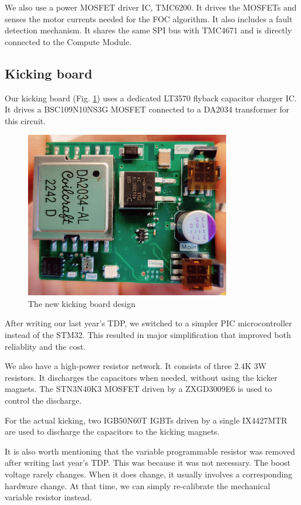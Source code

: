 \documentclass[runningheads]{llncs}
\begin{document}
We also use a power MOSFET driver IC, TMC6200. It drives the MOSFETs and senses the motor currents needed for the FOC algorithm. It also includes a fault detection mechanism. It shares the same SPI bus with TMC4671 and is directly connected to the Compute Module.

\subsection{Kicking board}
Our kicking board (Fig. \ref{fig:mikona}) uses a dedicated LT3570 flyback capacitor charger IC. It drives a BSC109N10NS3G MOSFET connected to a DA2034 transformer for this circuit.

\begin{figure}
    \centering
    \includegraphics[width=0.8\textwidth]{images/mikona.jpg}
    \caption{The new kicking board design}
    \label{fig:mikona}
\end{figure}

After writing our last year's TDP, we switched to a simpler PIC microcontroller instead of the STM32. This resulted in major simplification that improved both reliablity and the cost.

We also have a high-power resistor network. It consists of three 2.4K 3W resistors. It discharges the capacitors when needed, without using the kicker magnets. The STN3N40K3 MOSFET driven by a ZXGD3009E6 is used to control the discharge.

For the actual kicking, two IGB50N60T IGBTs driven by a single IX4427MTR are used to discharge the capacitors to the kicking magnets.

It is also worth mentioning that the variable programmable resistor was removed after writing last year's TDP. This was because it was not necessary. The boost voltage rarely changes. When it does change, it usually involves a corresponding hardware change. At that time, we can simply re-calibrate the mechanical variable resistor instead.
\end{document}
